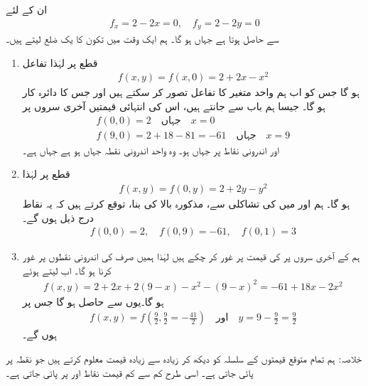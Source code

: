 \quad
ان   کے لئے
\begin{align*}
f_x=2-2x=0,\quad f_y=2-2y=0
\end{align*}
سے   حاصل ہوتا ہے جہاں  ہو گا۔
\quad
ہم  ایک وقت میں تکون کا یک ضلع  لیتے ہیں۔
\begin{enumerate}[1.]
\item
قطع  پر   لہٰذا تفاعل
\begin{align*}
f(x,y)=f(x,0)=2+2x-x^2
\end{align*}
ہو گا جس کو اب ہم واحد متغیر  کا تفاعل تصور کر سکتے ہیں اور جس کا دائرہ کار  ہو گا۔ جیسا ہم باب  سے جانتے ہیں، اس کی انتہائی قیمتیں  آخری سروں پر
\begin{align*}
f(0,0)=2\quad \text{جہاں}\quad x=0\\
f(9,0)=2+18-81=-61\quad \text{جہاں}\quad x=9
\end{align*}
 اور اندرونی نقاط پر جہاں  ہو۔ وہ واحد اندرونی نقطہ جہاں  ہو  ہے جہاں  ہے۔
\item
قطع  پر   لہٰذا
\begin{align*}
f(x,y)=f(0,y)=2+2y-y^2
\end{align*}
ہو گا۔ ہم  اور  میں  کی تشاکلی سے، مذکورہ بالا کی بنا،  توقع کرتے ہیں کہ یہ نقاط درج ذیل ہوں گے۔
\begin{align*}
f(0,0)=2,\quad f(0,9)=-61,\quad f(0,1)=3
\end{align*} 
\item
ہم  کے آخری  سروں پر  کی قیمت پر غور کر چکے ہیں لہٰذا ہمیں صرف  کی اندرونی نقطوں پر غور کرنا ہو گا۔ اب  لیتے ہوئے
\begin{align*}
f(x,y)=2+2x+2(9-x)-x^2-(9-x)^2=-61+18x-2x^2
\end{align*}
ہو گا۔یوں  سے  حاصل ہو گا جس پر  
\begin{align*}
f(x,y)=f(\frac{9}{2},\frac{9}{2}=-\frac{41}{2})\quad \text{اور}\quad y=9-\frac{9}{2}=\frac{9}{2}
\end{align*}
ہوں گے۔
\end{enumerate}

خلاصہ: ہم تمام متوقع قیمتوں کے سلسلہ  کو  دیکھ کر زیادہ سے زیادہ قیمت   معلوم کرتے ہیں جو نقطہ  پر پائی جاتی  ہے۔ اسی طرح کم سے کم قیمت  نقاط   اور   پر پائی جاتی ہے۔ 

